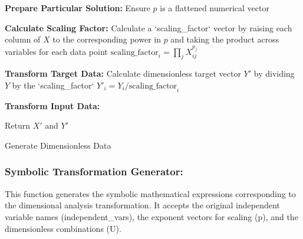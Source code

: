 \documentclass{article}
\begin{document}
\begin{algorithm}[H]
\SetAlgoLined
{}

\textbf{Prepare Particular Solution:}\;
Ensure \(p\) is a flattened numerical vector\;

\textbf{Calculate Scaling Factor:}\;
Calculate a `scaling_factor` vector by raising each column of \(X\) to the corresponding power in \(p\) and taking the product across variables for each data point\;
\( \text{scaling\_factor}_i = \prod_{j} X_{ij}^{p_j} \)\;

\textbf{Transform Target Data:}\;
Calculate dimensionless target vector \(Y'\) by dividing \(Y\) by the `scaling_factor`\;
\( Y'_i = Y_i / \text{scaling\_factor}_i \)\;

\textbf{Transform Input Data:}\;

Return \(X'\) and \(Y'\)\;

\caption{Generate Dimensionless Data}
\label{alg:generate_dimensionless_data} %
\end{algorithm}






\subsubsection{Symbolic Transformation Generator: }

This function generates the symbolic mathematical expressions corresponding to the dimensional analysis transformation. It accepts the original independent variable names (independent\_vars), the exponent vectors for scaling (p), and the dimensionless combinations (U).\\
\end{document}
